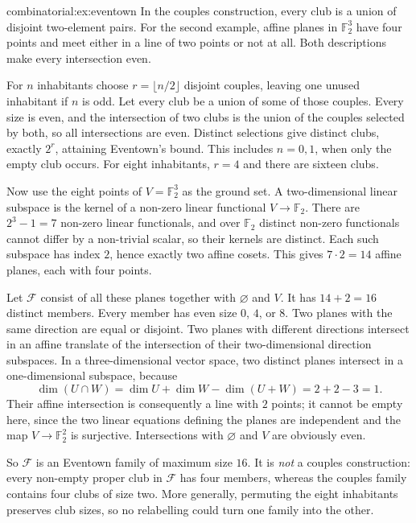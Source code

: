 \begin{solution}{combinatorial:ex:eventown}
\idea In the couples construction, every club is a union of disjoint two-element pairs. For the second example, affine planes in $\mathbb F_2^3$ have four points and meet either in a line of two points or not at all. Both descriptions make every intersection even.

\writeup For $n$ inhabitants choose $r=\lfloor n/2\rfloor$ disjoint
couples, leaving one unused inhabitant if $n$ is odd. Let every club be a
union of some of those couples. Every size is even, and the intersection
of two clubs is the union of the couples selected by both, so all
intersections are even. Distinct selections give distinct clubs, exactly
$2^r$, attaining Eventown's bound. This includes $n=0,1$, when only the
empty club occurs. For eight inhabitants, $r=4$ and there are sixteen clubs.

Now use the eight points of $V=\mathbb F_2^3$ as the ground set. A two-dimensional linear subspace is the kernel of a non-zero linear functional $V\to\mathbb F_2$. There are $2^3-1=7$ non-zero linear functionals, and over $\mathbb F_2$ distinct non-zero functionals cannot differ by a non-trivial scalar, so their kernels are distinct. Each such subspace has index $2$, hence exactly two affine cosets. This gives $7\cdot2=14$ affine planes, each with four points.

Let $\mathcal F$ consist of all these planes together with $\varnothing$ and $V$. It has $14+2=16$ distinct members. Every member has even size $0$, $4$, or $8$. Two planes with the same direction are equal or disjoint. Two planes with different directions intersect in an affine translate of the intersection of their two-dimensional direction subspaces. In a three-dimensional vector space, two distinct planes intersect in a one-dimensional subspace, because
\[
\dim(U\cap W)=\dim U+\dim W-\dim(U+W)=2+2-3=1.
\]
Their affine intersection is consequently a line with $2$ points; it cannot be empty here, since the two linear equations defining the planes are independent and the map $V\to\mathbb F_2^2$ is surjective. Intersections with $\varnothing$ and $V$ are obviously even.

So $\mathcal F$ is an Eventown family of maximum size $16$. It is \emph{not} a couples construction: every non-empty proper club in $\mathcal F$ has four members, whereas the couples family contains four clubs of size two. More generally, permuting the eight inhabitants preserves club sizes, so no relabelling could turn one family into the other.
\end{solution}

